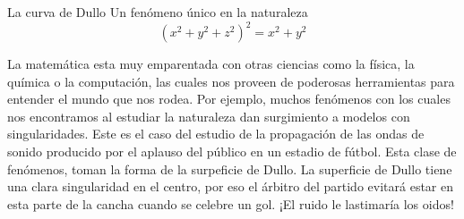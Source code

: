 \begin{surferPage}{La curva de Dullo}
Un fenómeno único en la naturaleza\\
\smallskip
\[(x^2+ y^2+ z^2)^2	= x^2+ y^2\]

\singlespacing
La matemática esta muy emparentada con otras ciencias como la física, la química o la computación, las cuales nos proveen de poderosas herramientas para entender el mundo que nos rodea. 
\singlespacing
Por ejemplo, muchos fenómenos con los cuales nos encontramos al estudiar la naturaleza dan surgimiento a modelos con singularidades.
\singlespacing
Este es el caso del estudio de la propagación de las ondas de sonido producido por el aplauso del público en un estadio de fútbol. Esta clase de fenómenos, toman la forma de la surpeficie de Dullo. La superficie de Dullo tiene una clara singularidad en el centro, por eso el árbitro del partido evitará estar en esta parte de la cancha cuando se celebre un gol. ¡El ruido le lastimaría los oidos!
\end{surferPage}
